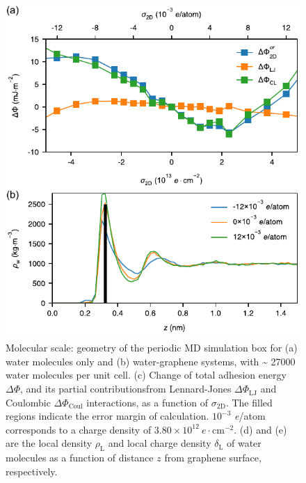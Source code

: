 \documentclass[journal=ancac3,manuscript=article,email=true,hyperref=true,keywords=true]{achemso}
\begin{document}
\begin{figure}[htbp]
\centering
\includegraphics[width=0.9\linewidth]{../img/fig-pot-dens.pdf}
\caption{\label{fig:MD-res}
Molecular scale: geometry of the periodic MD simulation box for (a) water molecules only and (b) water-graphene systems, with \textasciitilde{} 27000 water molecules per unit cell. (c) Change of total adhesion energy \(\Delta\Phi\), and its partial contributionsfrom Lennard-Jones  \(\Delta\Phi_{\mathrm{LJ}}\) and Coulombic  \(\Delta\Phi_{\mathrm{Coul}}\) interactions, as a function of \(\sigma_{\mathrm{2D}}\). The filled regions indicate the error margin of calculation. \(10^{-3}\) \textit{e}/atom corresponds to a charge density of \(3.80 \times 10^{12}\ e \cdot \mathrm{cm}^{-2}\). (d) and (e) are the local density \(\rho_{\mathrm{L}}\) and local charge density \(\delta_{\mathrm{L}}\) of water molecules as a function of distance \(z\) from graphene surface, respectively.}
\end{figure}
\end{document}
